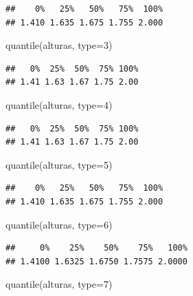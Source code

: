 \documentclass[
]{book}
\newenvironment{Shaded}{\begin{snugshade}}{\end{snugshade}}
\newcommand{\AttributeTok}[1]{\textcolor[rgb]{0.77,0.63,0.00}{#1}}
\newcommand{\DecValTok}[1]{\textcolor[rgb]{0.00,0.00,0.81}{#1}}
\newcommand{\FunctionTok}[1]{\textcolor[rgb]{0.00,0.00,0.00}{#1}}
\newcommand{\NormalTok}[1]{#1}
\begin{document}
\begin{verbatim}
##    0%   25%   50%   75%  100% 
## 1.410 1.635 1.675 1.755 2.000
\end{verbatim}

\begin{Shaded}
\begin{Highlighting}[]
\FunctionTok{quantile}\NormalTok{(alturas, }\AttributeTok{type=}\DecValTok{3}\NormalTok{)}
\end{Highlighting}
\end{Shaded}

\begin{verbatim}
##   0%  25%  50%  75% 100% 
## 1.41 1.63 1.67 1.75 2.00
\end{verbatim}

\begin{Shaded}
\begin{Highlighting}[]
\FunctionTok{quantile}\NormalTok{(alturas, }\AttributeTok{type=}\DecValTok{4}\NormalTok{)}
\end{Highlighting}
\end{Shaded}

\begin{verbatim}
##   0%  25%  50%  75% 100% 
## 1.41 1.63 1.67 1.75 2.00
\end{verbatim}

\begin{Shaded}
\begin{Highlighting}[]
\FunctionTok{quantile}\NormalTok{(alturas, }\AttributeTok{type=}\DecValTok{5}\NormalTok{)}
\end{Highlighting}
\end{Shaded}

\begin{verbatim}
##    0%   25%   50%   75%  100% 
## 1.410 1.635 1.675 1.755 2.000
\end{verbatim}

\begin{Shaded}
\begin{Highlighting}[]
\FunctionTok{quantile}\NormalTok{(alturas, }\AttributeTok{type=}\DecValTok{6}\NormalTok{)}
\end{Highlighting}
\end{Shaded}

\begin{verbatim}
##     0%    25%    50%    75%   100% 
## 1.4100 1.6325 1.6750 1.7575 2.0000
\end{verbatim}

\begin{Shaded}
\begin{Highlighting}[]
\FunctionTok{quantile}\NormalTok{(alturas, }\AttributeTok{type=}\DecValTok{7}\NormalTok{)}
\end{Highlighting}
\end{Shaded}
\end{document}
